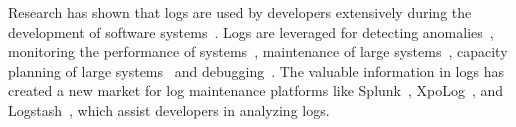 \documentclass[conference]{IEEEtran}
\begin{document}



Research has shown that logs are used by developers extensively
during the development of software systems~\cite{Characterizinglogs}. Logs are leveraged for detecting anomalies~\cite{XUanomalies,ConsoleLogs,Marksyer}, monitoring the performance of systems~\cite{Bitperformance}, maintenance of large systems~\cite{Marksyer}, capacity planning of large systems~\cite{IanWCRE} and debugging~\cite{EMSEIAN}. The valuable information in logs has created a new market for log maintenance platforms like Splunk~\cite{Bitperformance}, XpoLog~\cite{Xpolog}, and Logstash~\cite{Logstash}, which assist developers in analyzing logs.
\end{document}
